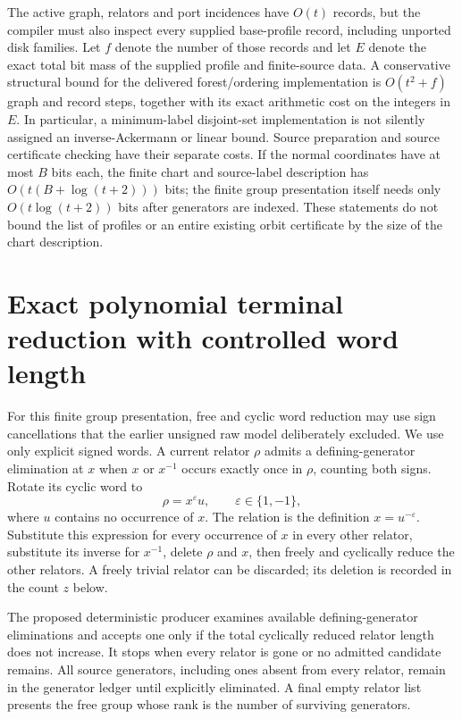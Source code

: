 The active graph, relators and port incidences have $O(t)$ records, but
the compiler must also inspect every supplied base-profile record,
including unported disk families.  Let $f$ denote the number of those
records and let $E$ denote the exact total bit mass of the supplied
profile and finite-source data.  A conservative structural bound for
the delivered forest/ordering implementation is $O(t^2+f)$ graph and
record steps, together with its exact arithmetic cost on the integers
in $E$.  In particular, a minimum-label disjoint-set implementation is
not silently assigned an inverse-Ackermann or linear bound.  Source
preparation and source certificate checking have their separate costs.
If the normal coordinates have at most $B$ bits each, the finite chart
and source-label description has $O(t(B+\log(t+2)))$ bits; the finite
group presentation itself needs only $O(t\log(t+2))$ bits after generators
are indexed.  These statements do not bound the list of profiles or an
entire existing orbit certificate by the size of the chart description.

\section{Exact polynomial terminal reduction with controlled word length}
\label{sec:no-growth-tietze}

For this finite group presentation, free and cyclic word reduction may
use sign cancellations that the earlier unsigned raw model deliberately
excluded.  We use only explicit signed words.  A current relator $\rho$
admits a defining-generator elimination at $x$ when $x$ or $x^{-1}$
occurs exactly once in $\rho$, counting both signs.  Rotate its cyclic
word to
\[
 \rho=x^{\varepsilon}u,\qquad\varepsilon\in\{1,-1\},
\]
where $u$ contains no occurrence of $x$.  The relation is the definition
$x=u^{-\varepsilon}$.  Substitute this expression for every occurrence
of $x$ in every other relator, substitute its inverse for $x^{-1}$,
delete $\rho$ and $x$, then freely and cyclically reduce the other
relators.  A freely trivial relator can be discarded; its deletion is
recorded in the count $z$ below.

The proposed deterministic producer examines available defining-generator
eliminations and accepts one only if the total cyclically reduced relator
length does not increase.  It stops when every relator is gone or no
admitted candidate remains.  All source generators, including ones absent
from every relator, remain in the generator ledger until explicitly
eliminated.  A final empty relator list presents the free group whose rank
is the number of surviving generators.

